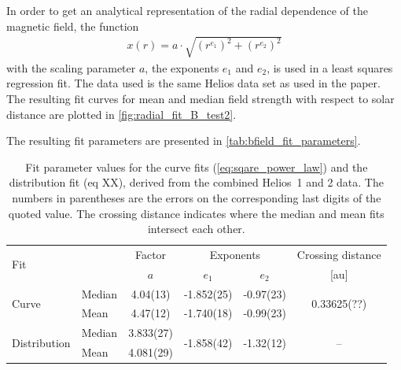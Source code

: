 In order to get an analytical representation of the radial dependence of the magnetic field, the function
\begin{align}
	x(r) = a \cdot \sqrt{\left(r^{e_1}\right)^2 + \left(r^{e_2}\right)^2}	\label{eq:sqare_power_law}
\end{align}
with the scaling parameter $a$, the exponents $e_1$ and $e_2$, is used in a least squares regression fit. The data used is the same Helios data set as used in the paper.\\

The resulting fit curves for mean and median field strength with respect to solar distance are plotted in \autoref{fig:radial_fit_B_test2}.
\begin{figure}[htb]
\end{figure}
The resulting fit parameters are presented in \autoref{tab:bfield_fit_parameters}.\\
\begin{table}
	\caption{Fit parameter values for the curve fits (\autoref{eq:sqare_power_law}) and the distribution fit (eq XX), derived from the combined Helios~1 and 2 data. The numbers in parentheses are the errors on the corresponding last digits of the quoted value. The crossing distance indicates where the median and mean fits intersect each other.}
	\label{tab:bfield_fit_parameters}
	\centering
	\begin{tabular}{l l c c c c}
		\hline\hline
		\multirow{2}{*}{Fit}	&	&Factor	&\multicolumn{2}{c}{Exponents}	&Crossing distance\\
		\cline{3-4}
			&	&$a$	&$e_1$	&$e_2$	&[au]\\
		\hline
		\multirow{2}{*}{Curve}	&Median	&4.04(13)	&-1.852(25)	&-0.97(23)	&\multirow{2}{*}{0.33625(??)}\\
			&Mean	&4.47(12)	&-1.740(18)	&-0.99(23)	&\\
		\multirow{2}{*}{Distribution}	&Median	&3.833(27)	&\multirow{2}{*}{-1.858(42)}	&\multirow{2}{*}{-1.32(12)}	&\multirow{2}{*}{--}\\
			&Mean	&4.081(29)	&	&	&\\
		\hline
	\end{tabular}
\end{table}
